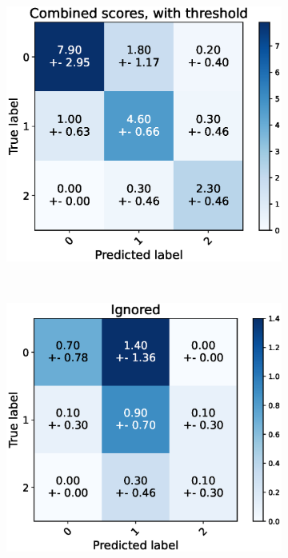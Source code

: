 \begin{figure}[h]
  \begin{subfigure}[t]{0.48\textwidth}
      \includegraphics[width=\textwidth]{files/figs/res/trunk/cnf-combined-th.eps}
      \caption{}
      \label{fig:trunk-cnf-comb-th}
  \end{subfigure}
  ~
  \begin{subfigure}[t]{0.48\textwidth}
      \includegraphics[width=\textwidth]{files/figs/res/trunk/cnf-ignored.eps}

\end{subfigure}
\end{figure}
